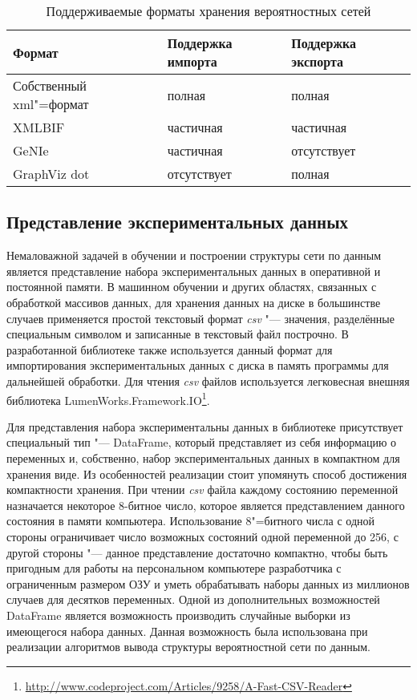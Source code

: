 \begin{table}[ht]
\caption{Поддерживаемые форматы хранения вероятностных сетей}
\label{table:arch_and_mod:net_persistence:supported_formats}
\centering
  \begin{tabular}{| >{\raggedright}m{} 
                  | >{\centering}m{} 
                  | >{\centering\arraybackslash}m{}|}
  \hline Формат & Поддержка импорта & Поддержка экспорта \\
  \hline Собственный xml"=формат & полная & полная \\
  \hline XMLBIF & частичная & частичная \\
  \hline GeNIe & частичная & отсутствует \\
  \hline GraphViz dot & отсутствует & полная \\
  \hline
  \end{tabular}
\end{table}



\subsection{Представление экспериментальных данных}
\label{sub:arch_and_mod:dataframe}

Немаловажной задачей в обучении и построении структуры сети по данным является представление набора экспериментальных данных в оперативной и постоянной памяти.
В машинном обучении и других областях, связанных с обработкой массивов данных, для хранения данных на диске в большинстве случаев применяется простой текстовый формат \emph{csv} "--- значения, разделённые специальным символом и записанные в текстовый файл построчно.
В разработанной библиотеке также используется данный формат для импортирования экспериментальных данных с диска в память программы для дальнейшей обработки.
Для чтения \emph{csv} файлов используется легковесная внешняя библиотека LumenWorks.Framework.IO\footnote{\url{http://www.codeproject.com/Articles/9258/A-Fast-CSV-Reader}}.

Для представления набора экспериментальны данных в библиотеке присутствует специальный тип "--- DataFrame, который представляет из себя информацию о переменных и, собственно, набор экспериментальных данных в компактном для хранения виде.
Из особенностей реализации стоит упомянуть способ достижения компактности хранения.
При чтении \emph{csv} файла каждому состоянию переменной назначается некоторое 8-битное число, которое является представлением данного состояния в памяти компьютера.
Использование 8"=битного числа с одной стороны ограничивает число возможных состояний одной переменной до \num{256}, с другой стороны "--- данное представление достаточно компактно, чтобы быть пригодным для работы на персональном компьютере разработчика с ограниченным размером ОЗУ и уметь обрабатывать наборы данных из миллионов случаев для десятков переменных.
Одной из дополнительных возможностей DataFrame является возможность производить случайные выборки из имеющегося набора данных.
Данная возможность была использована при реализации алгоритмов вывода структуры вероятностной сети по данным.


